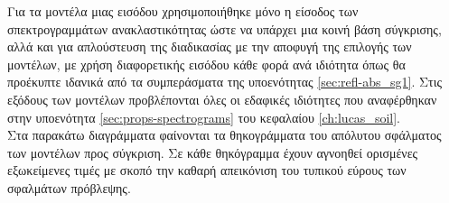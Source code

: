 Για τα μοντέλα μιας εισόδου χρησιμοποιήθηκε μόνο η είσοδος των σπεκτρογραμμάτων ανακλαστικότητας ώστε να υπάρχει μια κοινή βάση σύγκρισης, αλλά και για απλούστευση της διαδικασίας με την αποφυγή της επιλογής των μοντέλων, με χρήση διαφορετικής εισόδου κάθε φορά ανά ιδιότητα όπως θα προέκυπτε ιδανικά από τα συμπεράσματα της υποενότητας \ref{sec:refl-abs_sg1}. Στις εξόδους των μοντέλων προβλέπονται όλες οι εδαφικές ιδιότητες που αναφέρθηκαν στην υποενότητα \ref{sec:props-spectrograms} του κεφαλαίου \ref{ch:lucas_soil}.\\

Στα παρακάτω διαγράμματα φαίνονται τα θηκογράμματα του απόλυτου σφάλματος των μοντέλων προς σύγκριση. Σε κάθε θηκόγραμμα έχουν αγνοηθεί ορισμένες εξωκείμενες τιμές με σκοπό την καθαρή απεικόνιση του τυπικού εύρους των σφαλμάτων πρόβλεψης.

